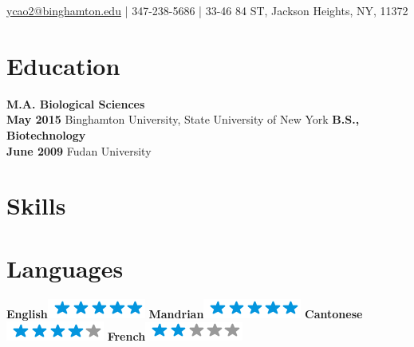 \documentclass[]{friggeri-cv}
\begin{document}
{\href{mailto:ycao2@binghamton.edu}{ycao2@binghamton.edu} | 347-238-5686 |
33-46 84 ST, Jackson Heights, NY, 11372}

\hfill
\begin{aside}
	\section{Education}
		\textbf{M.A. Biological Sciences\\May 2015}
		{Binghamton University, State University of New York}
		\textbf{B.S., Biotechnology\\June 2009}
		{Fudan University}
	\section{Skills}
  \section{Languages}
    \textbf{English}\includegraphics[scale=0.40]{img/5stars.png}
    \textbf{Mandrian}\includegraphics[scale=0.40]{img/5stars.png}
    \textbf{Cantonese}\includegraphics[scale=0.40]{img/4stars.png}
    \textbf{French}\includegraphics[scale=0.40]{img/2stars.png}
\end{aside}
\end{document}

